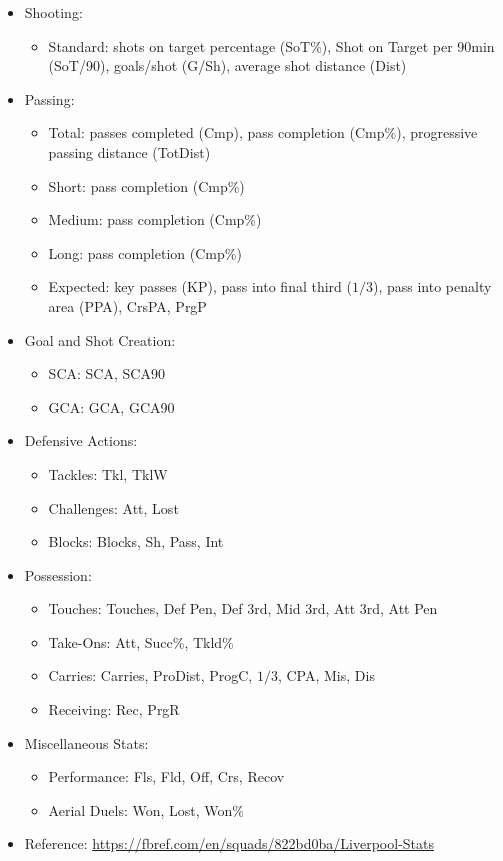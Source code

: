 \documentclass[12pt]{report}
\begin{document}
{\begin{itemize}
\begin{itemize}
        \item Shooting:
        \begin{itemize}
            \item Standard: shots on target percentage (SoT\%), Shot on Target per 90min (SoT/90), goals/shot (G/Sh), average shot distance (Dist)
        \end{itemize}
        \item Passing:
        \begin{itemize}
            \item Total: passes completed (Cmp), pass completion (Cmp\%), progressive passing distance (TotDist)
            \item Short: pass completion (Cmp\%)
            \item Medium: pass completion (Cmp\%)
            \item Long: pass completion (Cmp\%)
            \item Expected: key passes (KP), pass into final third ($1/3$), pass into penalty area (PPA), CrsPA, PrgP
        \end{itemize}
        \item Goal and Shot Creation:
        \begin{itemize}
            \item SCA: SCA, SCA90
            \item GCA: GCA, GCA90
        \end{itemize}
        \item Defensive Actions:
        \begin{itemize}
            \item Tackles: Tkl, TklW
            \item Challenges: Att, Lost
            \item Blocks: Blocks, Sh, Pass, Int
        \end{itemize}
        \item Possession:
        \begin{itemize}
            \item Touches: Touches, Def Pen, Def 3rd, Mid 3rd, Att 3rd, Att Pen
            \item Take-Ons: Att, Succ\%, Tkld\%
            \item Carries: Carries, ProDist, ProgC, $1/3$, CPA, Mis, Dis
            \item Receiving: Rec, PrgR
        \end{itemize}
        \item Miscellaneous Stats:
        \begin{itemize}
            \item Performance: Fls, Fld, Off, Crs, Recov
            \item Aerial Duels: Won, Lost, Won\%
        \end{itemize}
        \item Reference: \url{https://fbref.com/en/squads/822bd0ba/Liverpool-Stats}
    \end{itemize}
\end{itemize}

}
\end{document}
